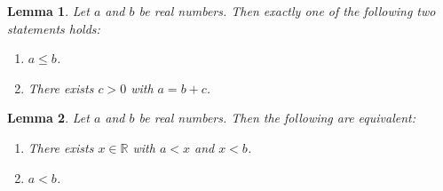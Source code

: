 \documentclass{article}
\newtheorem{lemma}{Lemma}
\begin{document}
\begin{lemma}\label{trichotomy}
Let $a$ and $b$ be real numbers. Then exactly one of the following two statements holds:
\begin{enumerate}
\item $a\le b$.
\item There exists $c>0$ with $a=b+c$.
\end{enumerate}
\end{lemma}

\begin{lemma}\label{between}
Let $a$ and $b$ be real numbers. Then the following are equivalent:
\begin{enumerate}
\item There exists $x \in \mathbb{R}$ with $a<x$ and $x<b$.
\item $a<b$.
\end{enumerate}
\end{lemma}
\end{document}
